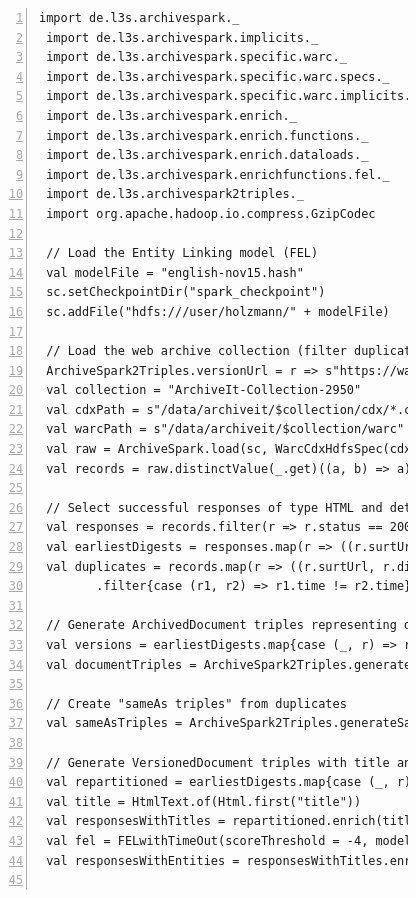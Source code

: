 \documentclass[twocolumn]{svjour3}
\begin{document}
\begin{figure}[th]
\centering \scriptsize
\begin{Verbatim}[frame=lines,numbers=left,numbersep=1pt]
 import de.l3s.archivespark._
 import de.l3s.archivespark.implicits._
 import de.l3s.archivespark.specific.warc._
 import de.l3s.archivespark.specific.warc.specs._
 import de.l3s.archivespark.specific.warc.implicits._
 import de.l3s.archivespark.enrich._
 import de.l3s.archivespark.enrich.functions._
 import de.l3s.archivespark.enrich.dataloads._
 import de.l3s.archivespark.enrichfunctions.fel._
 import de.l3s.archivespark2triples._
 import org.apache.hadoop.io.compress.GzipCodec

 // Load the Entity Linking model (FEL)
 val modelFile = "english-nov15.hash"
 sc.setCheckpointDir("spark_checkpoint")
 sc.addFile("hdfs:///user/holzmann/" + modelFile)

 // Load the web archive collection (filter duplicates and very big records)
 ArchiveSpark2Triples.versionUrl = r => s"https://wayback.archive-it.org/2950/${r.timestamp}/${r.originalUrl}"
 val collection = "ArchiveIt-Collection-2950"
 val cdxPath = s"/data/archiveit/$collection/cdx/*.cdx.gz"
 val warcPath = s"/data/archiveit/$collection/warc"
 val raw = ArchiveSpark.load(sc, WarcCdxHdfsSpec(cdxPath, warcPath))
 val records = raw.distinctValue(_.get)((a, b) => a).filter(_.compressedSize < 1024 * 100).cache // 100 kb

 // Select successful responses of type HTML and detect duplicates
 val responses = records.filter(r => r.status == 200 && r.mime == "text/html")
 val earliestDigests = responses.map(r => ((r.surtUrl, r.digest), r)).reduceByKey{(r1, r2) => if (r1.time < r2.time) r1 else r2 }
 val duplicates = records.map(r => ((r.surtUrl, r.digest), r)).join(earliestDigests).map{case (_, records) => records}
        .filter{case (r1, r2) => r1.time != r2.time}

 // Generate ArchivedDocument triples representing distinct webpages
 val versions = earliestDigests.map{case (_, r) => r}.union(duplicates.map{case (r1, r2) => r1})
 val documentTriples = ArchiveSpark2Triples.generateDocs(versions)

 // Create "sameAs triples" from duplicates
 val sameAsTriples = ArchiveSpark2Triples.generateSameAsVersions(duplicates)

 // Generate VersionedDocument triples with title and entities
 val repartitioned = earliestDigests.map{case (_, r) => r}.repartition(5000)
 val title = HtmlText.of(Html.first("title"))
 val responsesWithTitles = repartitioned.enrich(title)
 val fel = FELwithTimeOut(scoreThreshold = -4, modelFile = modelFile).on(HtmlText)
 val responsesWithEntities = responsesWithTitles.enrich(fel)


\end{Verbatim}
\end{figure}
\end{document}
